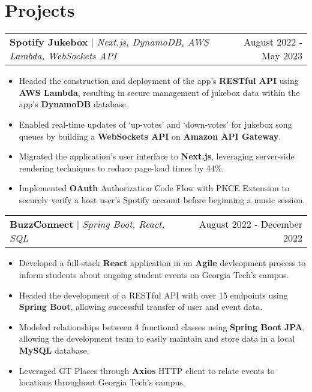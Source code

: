 \documentclass[letterpaper,11pt]{article}
\makeatletter
\newcommand{\resumeProjectHeading}[3]{
    \begin{tabular*}{0.97\textwidth}[t]{l@{\extracolsep{\fill}}r}
      \textbf{#1} $\vert$ \textit{#2}  & {#3}
    \end{tabular*}\vspace{-3pt}
}
\newcommand{\resumeItemListStart}{\begin{itemize}[noitemsep]\vspace{-4pt}}
\newcommand{\resumeItemListEnd}{\end{itemize}}
\makeatother
\begin{document}
\section{Projects}
    \resumeProjectHeading{Spotify Jukebox}{Next.js, DynamoDB, AWS Lambda, WebSockets API}{August 2022 - May 2023}
      \resumeItemListStart
        \item {Headed the construction and deployment of the app's \textbf{RESTful API} using \textbf{AWS Lambda}, resulting in secure management of jukebox data within the app's \textbf{DynamoDB} database.}
        \item {Enabled real-time updates of `up-votes' and `down-votes' for jukebox song queues by building a \textbf{WebSockets API} on \textbf{Amazon API Gateway}.}
        \item {Migrated the application's user interface to \textbf{Next.js}, leveraging server-side rendering techniques to reduce page-load times by 44\%.}
        \item {Implemented \textbf{OAuth} Authorization Code Flow with PKCE Extension to securely verify a host user's Spotify account before beginning a music session.}
      \resumeItemListEnd

    \resumeProjectHeading{BuzzConnect}{Spring Boot, React, SQL}{August 2022 - December 2022}
      \resumeItemListStart
        \item {Developed a full-stack \textbf{React} application in an \textbf{Agile} devleopment process to inform students about ongoing student events on Georgia Tech's campus.}
        \item {Headed the development of a RESTful API with over 15 endpoints using \textbf{Spring Boot}, allowing successful transfer of user and event data.}
        \item {Modeled relationships between 4 functional classes using \textbf{Spring Boot JPA}, allowing the development team to easily maintain and store data in a local \textbf{MySQL} database.}
        \item {Leveraged GT Places through \textbf{Axios} HTTP client to relate events to locations throughout Georgia Tech's campus.}
      \resumeItemListEnd

\end{document}
